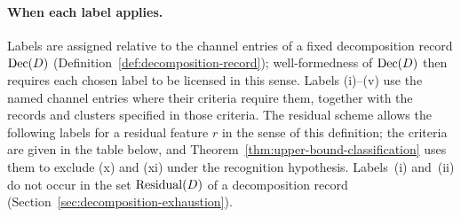 \paragraph{When each label applies.} Labels are assigned relative to the
channel entries of a fixed decomposition record \(\operatorname{Dec}\!\left(D\right)\)
(Definition~\ref{def:decomposition-record}); well-formedness of \(\operatorname{Dec}\!\left(D\right)\)
then requires each chosen label to be licensed in this sense. Labels (i)--(v) use
the named channel entries where their criteria require them, together with the
records and clusters specified in those criteria. The residual scheme allows the
following labels for a residual feature \(r\) in the sense of this
definition; the criteria are given in the table below, and
Theorem~\ref{thm:upper-bound-classification} uses them to exclude (x) and
(xi) under the recognition hypothesis. Labels~(i) and~(ii) do not occur in the
set \(\operatorname{Residual}\!\left(D\right)\) of a decomposition record
(Section~\ref{sec:decomposition-exhaustion}).
\begingroup\small
